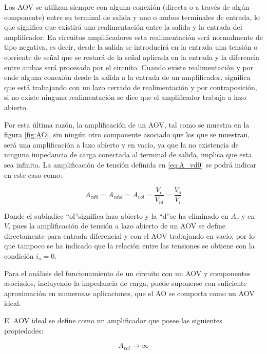 \documentclass[10pt,spanish,a4paper,openany,notitlepage]{article}
\begin{document}
Los AOV se utilizan siempre con alguna conexión (directa o a través de algún componente) entre
su terminal de salida y uno o ambos terminales de entrada, lo que significa que existirá una realimentación
entre la salida y la entrada del amplificador. En circuitos amplificadores esta realimentación
será normalmente de tipo negativa, es decir, desde la salida se introducirá en la entrada una tensión o
corriente de señal que se restará de la señal aplicada en la entrada y la diferencia entre ambas será
procesada por el circuito. Cuando existe realimentación y por ende alguna conexión desde la salida a la
entrada de un amplificador, significa que está trabajando con un lazo cerrado de realimentación y por
contraposición, si no existe ninguna realimentación se dice que el amplificador trabaja a lazo abierto.

Por esta última razón, la amplificación de un AOV, tal como se muestra en la figura \ref{fig:AO}, sin ningún
otro componente asociado que los que se muestran, será una amplificación a lazo abierto y en
vacío, ya que la no existencia de ninguna impedancia de carga conectada al terminal de salida, implica
que esta sea infinita. La amplificación de tensión definida en \ref{eq:A_vd0} se podrá indicar en este caso como:

\begin{equation}
    A_{vd0} = A_{vdol} = A_{vol} = \frac{V_o}{V_{id}} = \frac{V_o}{V_i}
    \label{eq:A_vol}
\end{equation}

Donde el subíndice \textquotedblleft ol\textquotedblright significa lazo abierto y la  \textquotedblleft d\textquotedblright se ha eliminado en $A_v$ y en $V_i$ pues la amplificación
de tensión a lazo abierto de un AOV se define directamente para entrada diferencial y con el
AOV trabajando en vacío, por lo que tampoco se ha indicado que la relación entre las tensiones se obtiene
con la condición $i_o = 0$.

Para el análisis del funcionamiento de un circuito con un AOV y componentes asociados, incluyendo
la impedancia de carga, puede suponerse con suficiente aproximación en numerosas aplicaciones,
que el AO se comporta como un AOV ideal.

El AOV ideal se define como un amplificador que posee las siguientes propiedades:

\begin{equation}
    A_{vol} \rightarrow \infty
    \label{eq:Avol_ideal}
\end{equation}
\end{document}
